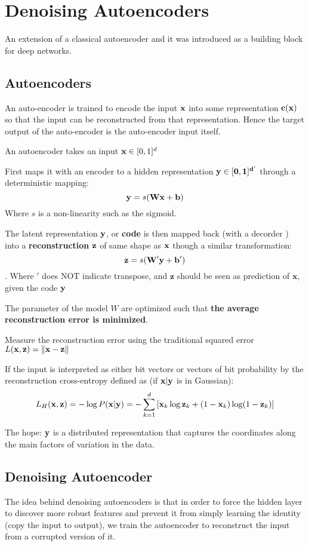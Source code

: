 \chapter{Denoising Autoencoders}
An extension of a classical autoencoder and it was introduced as a
building block for deep networks. 
\section{Autoencoders}
An auto-encoder is trained to encode the input $\mathbf{x}$ into some
representation $\mathbf{c}(\mathbf{x})$ so that the input can be reconstructed
from that representation. Hence the target output of the auto-encoder is
the auto-encoder input itself.

An autoencoder takes an input $ \mathbf{x}\in [0,1]^d$

First maps it with an encoder to a hidden representation $\bf y \in [ 0,
1]^{d'}$ through a deterministic mapping:
\[ \mathbf{y} = s(\mathbf{W}\mathbf{x} + \mathbf{b}) \]
Where $s$ is a non-linearity such as the sigmoid. 

The latent representation $\bf y$, or \textbf{code} is then mapped back
(with a decorder ) into a \textbf{reconstruction} $\bf z$ of same shape as
$\mathbf{x}$ though a similar transformation:
\[ \mathbf{z}= s(\mathbf{W}' \mathbf{y} + \mathbf{b}')\].
Where $'$ does NOT indicate transpose, and $\mathbf{z}$ should be seen as
prediction of $\mathbf{x}$, given the code $\mathbf{y}$

The parameter of the model $W$ are optimized such that \textbf{the average
reconstruction error is minimized}. 

Measure the reconstruction error using the traditional squared error
$L(\mathbf{x}, \mathbf{z}) = \|\mathbf{x} - \mathbf{z}\|$

If the input is interpreted as either bit vectors or vectors of bit
probability by the reconstruction cross-entropy defined as (if $\mathbf{x}|\mathbf{y}$
is in Gaussian):
\[ L_H(\mathbf{x}, \mathbf{z}) = -\log P(\mathbf{x}|\mathbf{y}) = -\sum_{k=1}^d\left[ \mathbf{x}_k\log
\mathbf{z}_k + (1-\mathbf{x}_k)\log (1-\mathbf{z}_k)\right]\]

The hope: $\mathbf{y}$ is a distributed representation that captures the
coordinates along the main factors of variation in the data.

\section{Denoising Autoencoder}
The idea behind denoising autoencoders is that in order to force the
hidden layer to discover more robust features and prevent it from simply
learning the identity (copy the input to output), we train the autoencoder
to reconstruct the input from a corrupted version of it.

